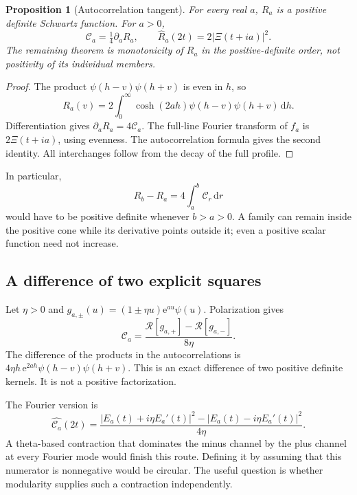 \documentclass[11pt,letterpaper]{article}
\numberwithin{equation}{section}
\newtheorem{proposition}{Proposition}[section]
\theoremstyle{remark}\newtheorem{remark}[proposition]{Remark}
\newcommand{\dd}{\,\mathrm d}
\newcommand{\calC}{\mathcal C}
\newcommand{\ee}{\mathrm e}
\begin{document}
\begin{proposition}[Autocorrelation tangent]\label{prop:tangent}
For every real $a$, $R_a$ is a positive definite Schwartz function. For $a>0$,
\begin{equation}\label{eq:tangent}
 \boxed{\calC_a=\tfrac14\partial_aR_a,\qquad
        \widehat R_a(2t)=2|\Xi(t+ia)|^2.}
\end{equation}
The remaining theorem is monotonicity of $R_a$ in the positive-definite order, not positivity of its individual members.
\end{proposition}
\begin{proof}
The product $\psi(h-v)\psi(h+v)$ is even in $h$, so
\[
 R_a(v)=2\int_0^\infty\cosh(2ah)\psi(h-v)\psi(h+v)\dd h.
\]
Differentiation gives $\partial_aR_a=4\calC_a$. The full-line Fourier transform of $f_a$ is $2\Xi(t+ia)$, using evenness. The autocorrelation formula gives the second identity. All interchanges follow from the decay of the full profile.
\end{proof}
In particular,
\[
 R_b-R_a=4\int_a^b\calC_r\dd r
\]
would have to be positive definite whenever $b>a>0$. A family can remain inside the positive cone while its derivative points outside it; even a positive scalar function need not increase.

\subsection{A difference of two explicit squares}
Let $\eta>0$ and $g_{a,\pm}(u)=(1\pm\eta u)\ee^{au}\psi(u)$. Polarization gives
\begin{equation}\label{eq:polar}
 \boxed{\calC_a=
 \frac{\mathscr R[g_{a,+}]-\mathscr R[g_{a,-}]}{8\eta}.}
\end{equation}
The difference of the products in the autocorrelations is
$4\eta h\,\ee^{2ah}\psi(h-v)\psi(h+v)$.
This is an exact difference of two positive definite kernels. It is not a positive factorization.

The Fourier version is
\[
 \widehat{\calC_a}(2t)
 =\frac{|E_a(t)+i\eta E_a'(t)|^2
             -|E_a(t)-i\eta E_a'(t)|^2}{4\eta}.
\]
A theta-based contraction that dominates the minus channel by the plus channel at every Fourier mode would finish this route. Defining it by assuming that this numerator is nonnegative would be circular. The useful question is whether modularity supplies such a contraction independently.
\end{document}
